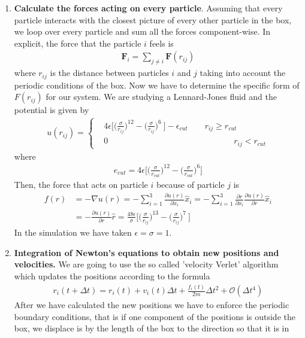 \documentclass[11pt]{article}
\begin{document}
\begin{enumerate}
	\item \textbf{Calculate the forces acting on every particle}. Assuming that every particle interacts with the closest picture of every other particle in the box, we loop over every particle and sum all the forces component-wise. In explicit, the force that the particle $i$ feels is
		\begin{align}
			\bm{F}_i=\sum_{j\neq i}\bm{F}(r_{ij})
		\end{align}
		where $r_{ij}$ is the distance between particles $i$ and $j$ taking into account the periodic conditions of the box. Now we have to determine the specific form of $F(r_{ij})$ for our system. We are studying a Lennard-Jones fluid and the potential is given by
		\begin{align}
			u(r_{ij})=
			\left\{\begin{aligned}
				&4\epsilon\bigg[\bigg(\frac{\sigma}{r_{ij}}\bigg)^{12}-\bigg(\frac{\sigma}{r_{ij}}\bigg)^6\ \bigg]-\epsilon_{cut}\qquad r_{ij}\geq r_{cut}\\
				&0 \qquad\qquad\qquad\qquad\qquad\qquad\qquad\quad  r_{ij}<r_{cut}
			\end{aligned}
			\right.
		\end{align}
		where
		\begin{align}
			e_{cut} = 4\epsilon \bigg[\bigg(\frac{\sigma}{r_{cut}}\bigg)^{12}-\bigg(\frac{\sigma}{r_{cut}}\bigg)^{6}\bigg]
		\end{align}
		Then, the force that acts on particle $i$ because of particle $j$ is
		\begin{align}
			f(r)&=-\nabla u(r)=-\sum_{i=1}^3\frac{\partial u(r)}{\partial x_i}\hat x_i=-\sum_{i=1}^3\frac{\partial r}{\partial x_i}\frac{\partial u(r)}{\partial r}\hat x_i\nonumber\\
			&=-\frac{\partial u(r)}{\partial r}\hat r=\frac{48\epsilon}{\sigma}\bigg[\bigg(\frac{\sigma}{r_{ij}}\bigg)^{13}-\bigg(\frac{\sigma}{r_{ij}}\bigg)^7\ \bigg]
		\end{align}
		In the simulation we have taken $\epsilon = \sigma = 1$.
		
		\item \textbf{Integration of Newton's equations to obtain new positions and velocities.} We are going to use the so called 'velocity Verlet' algorithm which updates the positions according to the formula
			\begin{align}
				r_i(t+\Delta t) = r_i(t) + v_i(t)\Delta t + \frac{f_i(t)}{2m}\Delta t^2 + \mathcal{O}(\Delta t^4)
				\label{position_update}
			\end{align}
			After we have calculated the new positions we have to enforce the periodic boundary conditions, that is if one component of the positions is outside the box, we displace is by the length of the box to the direction so that it is in 
			

\end{enumerate}
\end{document}
